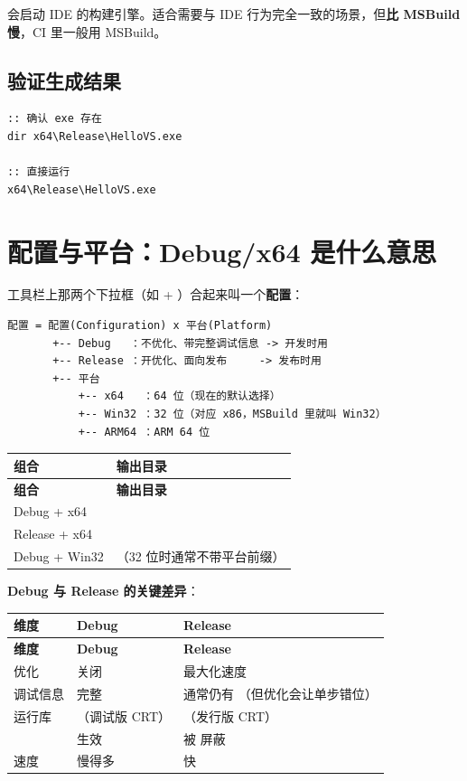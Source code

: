  会启动 IDE 的构建引擎。适合需要与 IDE 行为完全一致的场景，但\textbf{比 MSBuild 慢}，CI 里一般用 MSBuild。

\subsection{验证生成结果}

\begin{lstlisting}[style=shellstyle]
:: 确认 exe 存在
dir x64\Release\HelloVS.exe

:: 直接运行
x64\Release\HelloVS.exe
\end{lstlisting}

\section{配置与平台：Debug/x64 是什么意思}

工具栏上那两个下拉框（如  + ）合起来叫一个\textbf{配置}：

\begin{lstlisting}[style=textstyle]
配置 = 配置(Configuration) x 平台(Platform)
       +-- Debug   ：不优化、带完整调试信息 -> 开发时用
       +-- Release ：开优化、面向发布     -> 发布时用
       +-- 平台
           +-- x64   ：64 位（现在的默认选择）
           +-- Win32 ：32 位（对应 x86，MSBuild 里就叫 Win32）
           +-- ARM64 ：ARM 64 位
\end{lstlisting}

\begin{longtable}{L{5.0cm}L{10.0cm}}\toprule
\textbf{组合} & \textbf{输出目录} \\ \midrule \endfirsthead
\toprule \textbf{组合} & \textbf{输出目录} \\ \midrule \endhead
\bottomrule \endlastfoot
Debug + x64 &  \\
Release + x64 &  \\
Debug + Win32 & （32 位时通常不带平台前缀） \\
\end{longtable}

\textbf{Debug 与 Release 的关键差异}：

\begin{longtable}{L{3.2cm}L{4.4cm}L{7.0cm}}\toprule
\textbf{维度} & \textbf{Debug} & \textbf{Release} \\ \midrule \endfirsthead
\toprule \textbf{维度} & \textbf{Debug} & \textbf{Release} \\ \midrule \endhead
\bottomrule \endlastfoot
优化 &  关闭 &  最大化速度 \\
调试信息 &  完整 & 通常仍有 （但优化会让单步错位） \\
运行库 & （调试版 CRT） & （发行版 CRT） \\
 & 生效 & 被  屏蔽 \\
速度 & 慢得多 & 快 \\
\end{longtable}

